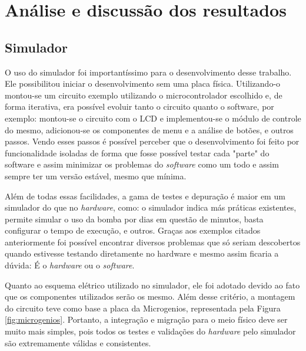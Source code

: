 \chapter{Análise e discussão dos resultados}

\section{Simulador}

O uso do simulador foi importantíssimo para o desenvolvimento desse trabalho. Ele possibilitou iniciar o desenvolvimento sem uma placa física. Utilizando-o montou-se um circuito exemplo utilizando o microcontrolador escolhido e, de forma iterativa, era possível evoluir tanto o circuito quanto o software, por exemplo: montou-se o circuito com o LCD e implementou-se o módulo de controle do mesmo, adicionou-se os componentes de menu e a análise de botões, e outros passos. Vendo esses passos é possível perceber que o desenvolvimento foi feito por funcionalidade isoladas de forma que fosse possível testar cada "parte" do software e assim minimizar os problemas do \emph{software} como um todo e assim sempre ter um versão estável, mesmo que mínima.

Além de todas essas facilidades, a gama de testes e depuração é maior em um simulador do que no \emph{hardware}, como: o simulador indica más práticas existentes, permite simular o uso da bomba por dias em questão de minutos, basta configurar o tempo de execução, e outros. Graças aos exemplos citados anteriormente foi possível encontrar diversos problemas que só seriam descobertos quando estivesse testando diretamente no hardware e mesmo assim ficaria a dúvida: É o \emph{hardware} ou o \emph{software}.

Quanto ao esquema elétrico utilizado no simulador, ele foi adotado devido ao fato que os componentes utilizados serão os mesmo. Além desse critério, a montagem do circuito teve como base a placa da Microgenios, representada pela Figura \ref{fig:microgenios}. Portanto, a integração e migração para o meio físico deve ser muito mais simples, pois todos os testes e validações do \emph{hardware} pelo simulador são extremamente válidas e consistentes.
 
 \newpage
 
